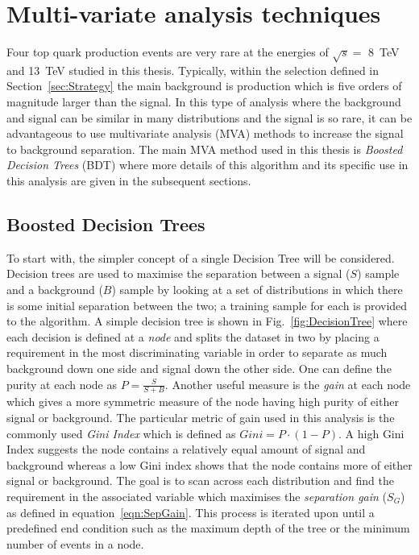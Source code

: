 \section{Multi-variate analysis techniques}

Four top quark production events are very rare at the energies of $\sqrt{s} = $ 8~TeV and 13~TeV studied in this thesis. Typically, within the selection defined in Section~\ref{sec:Strategy} the main background is \ttbar production which is five orders of magnitude larger than the \tttt signal. In this type of analysis where the background and signal can be similar in many distributions and the signal is so rare, it can be advantageous to use multivariate analysis (MVA) methods to increase the signal to background separation. The main MVA method used in this thesis is \emph{Boosted Decision Trees} (BDT) where more details of this algorithm and its specific use in this analysis are given in the subsequent sections.


\subsection{Boosted Decision Trees}
\label{sec:BDT}

To start with, the simpler concept of a single Decision Tree will be considered. Decision trees are used to maximise the separation between a signal ($S$) sample and a background ($B$) sample by looking at a set of distributions in which there is some initial separation between the two; a training sample for each is provided to the algorithm. A simple decision tree is shown in Fig.~\ref{fig:DecisionTree} where each decision is defined at a \emph{node} and splits the dataset in two by placing a requirement in the most discriminating variable in order to separate as much background down one side and signal down the other side.
One can define the purity at each node as $P=\frac{S}{S+B}$. Another useful measure is the \emph{gain} at each node which gives a more symmetric measure of the node having high purity of either signal or background. The particular metric of gain used in this analysis is the commonly used \emph{Gini Index} which is defined as $Gini = P\cdot\left(1-P\right)$. A high Gini Index suggests the node contains a relatively equal amount of signal and background whereas a low Gini index shows that the node contains more of either signal or background. 
The goal is to scan across each distribution and find the requirement in the associated variable which maximises the \emph{separation gain} ($S_{G}$) as defined in equation~\ref{eqn:SepGain}. This process is iterated upon until a predefined end condition such as the maximum depth of the tree or the minimum number of events in a node.


